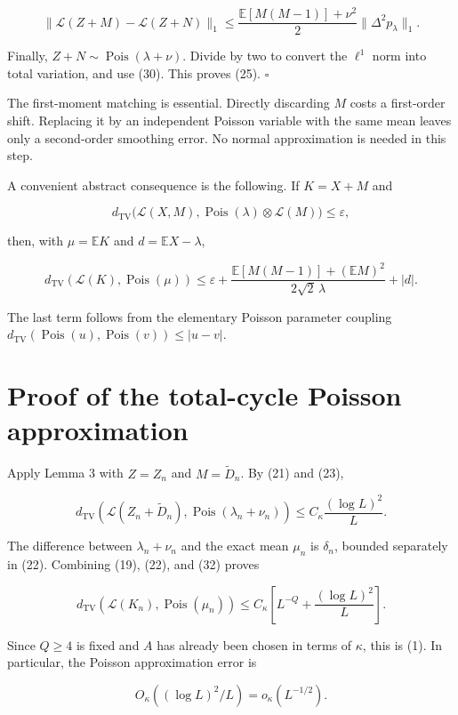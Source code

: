 \documentclass[
  11pt,
]{article}
\begin{document}
\[
 \|\mathcal L(Z+M)-\mathcal L(Z+N)\|_1
 \le\frac{\mathbb E[M(M-1)]+\nu^2}{2}
 \|\Delta^2p_\lambda\|_1.
\]

Finally, \(Z+N\sim\operatorname{Pois}(\lambda+\nu)\). Divide by two to
convert the \(\ell^1\) norm into total variation, and use (30). This
proves (25). \(\square\)

The first-moment matching is essential. Directly discarding \(M\) costs
a first-order shift. Replacing it by an independent Poisson variable
with the same mean leaves only a second-order smoothing error. No normal
approximation is needed in this step.

A convenient abstract consequence is the following. If \(K=X+M\) and

\[
 d_{\mathrm{TV}}\bigl(\mathcal L(X,M),
 \operatorname{Pois}(\lambda)\otimes\mathcal L(M)\bigr)\le\varepsilon,
\]

then, with \(\mu=\mathbb EK\) and \(d=\mathbb EX-\lambda\),

\[
 d_{\mathrm{TV}}(\mathcal L(K),\operatorname{Pois}(\mu))
 \le\varepsilon+
 \frac{\mathbb E[M(M-1)]+(\mathbb EM)^2}{2\sqrt2\,\lambda}
 +|d|.
\tag{31}
\]

The last term follows from the elementary Poisson parameter coupling
\(d_{\mathrm{TV}}(\operatorname{Pois}(u),\operatorname{Pois}(v))\le |u-v|\).

\section{Proof of the total-cycle Poisson
approximation}\label{proof-of-the-total-cycle-poisson-approximation}

Apply Lemma 3 with \(Z=Z_n\) and \(M=\widetilde D_n\). By (21) and (23),

\[
 d_{\mathrm{TV}}\!\left(
 \mathcal L(Z_n+\widetilde D_n),
 \operatorname{Pois}(\lambda_n+\nu_n)\right)
 \le C_\kappa\frac{(\log L)^2}{L}.
\tag{32}
\]

The difference between \(\lambda_n+\nu_n\) and the exact mean \(\mu_n\)
is \(\delta_n\), bounded separately in (22). Combining (19), (22), and
(32) proves

\[
 d_{\mathrm{TV}}\!\left(\mathcal L(K_n),\operatorname{Pois}(\mu_n)\right)
 \le C_\kappa\left[L^{-Q}+\frac{(\log L)^2}{L}\right].
\tag{33}
\]

Since \(Q\ge4\) is fixed and \(A\) has already been chosen in terms of
\(\kappa\), this is (1). In particular, the Poisson approximation error
is

\[
 O_\kappa((\log L)^2/L)=o_\kappa(L^{-1/2}).
\tag{34}
\]
\end{document}

